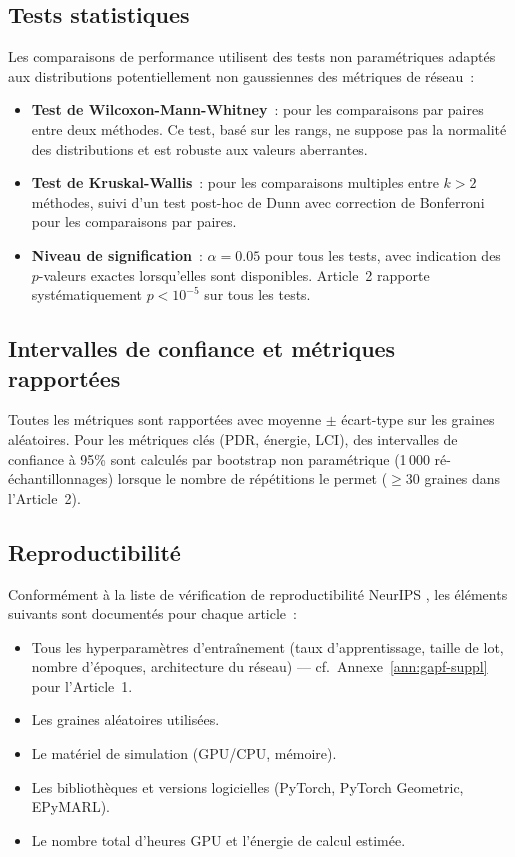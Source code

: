 \subsection{Tests statistiques}

Les comparaisons de performance utilisent des tests non paramétriques adaptés aux distributions potentiellement non gaussiennes des métriques de réseau~:
\begin{itemize}
    \item \textbf{Test de Wilcoxon-Mann-Whitney}~: pour les comparaisons par paires entre deux méthodes. Ce test, basé sur les rangs, ne suppose pas la normalité des distributions et est robuste aux valeurs aberrantes.
    \item \textbf{Test de Kruskal-Wallis}~: pour les comparaisons multiples entre $k > 2$ méthodes, suivi d'un test post-hoc de Dunn avec correction de Bonferroni pour les comparaisons par paires.
    \item \textbf{Niveau de signification}~: $\alpha = 0.05$ pour tous les tests, avec indication des $p$-valeurs exactes lorsqu'elles sont disponibles. Article~2 rapporte systématiquement $p < 10^{-5}$ sur tous les tests.
\end{itemize}

\subsection{Intervalles de confiance et métriques rapportées}

Toutes les métriques sont rapportées avec moyenne $\pm$ écart-type sur les graines aléatoires. Pour les métriques clés (PDR, énergie, LCI), des intervalles de confiance à 95\% sont calculés par bootstrap non paramétrique (1\,000 ré-échantillonnages) lorsque le nombre de répétitions le permet ($\geq 30$ graines dans l'Article~2).

\subsection{Reproductibilité}

Conformément à la liste de vérification de reproductibilité NeurIPS \cite{Pineau2021Reproducibility}, les éléments suivants sont documentés pour chaque article~:
\begin{itemize}
    \item Tous les hyperparamètres d'entraînement (taux d'apprentissage, taille de lot, nombre d'époques, architecture du réseau) --- cf.\ Annexe~\ref{ann:gapf-suppl} pour l'Article~1.
    \item Les graines aléatoires utilisées.
    \item Le matériel de simulation (GPU/CPU, mémoire).
    \item Les bibliothèques et versions logicielles (PyTorch, PyTorch Geometric, EPyMARL).
    \item Le nombre total d'heures GPU et l'énergie de calcul estimée.
\end{itemize}

